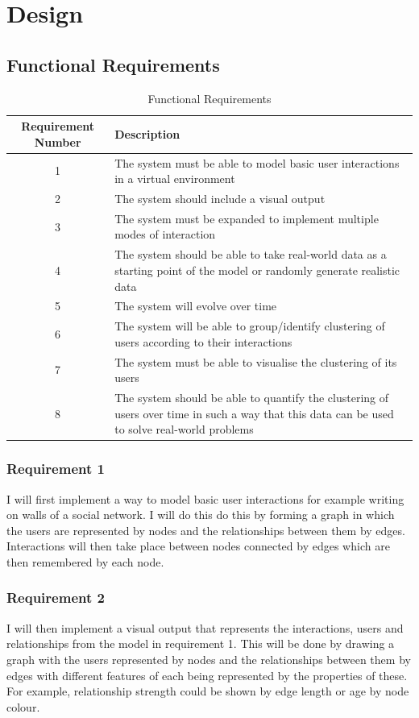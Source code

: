 \documentclass[12pt,a4paper]{article}
\begin{document}
\section{Design}

\subsection{Functional Requirements}

\begin{table}[htb]
\centering
\caption{Functional Requirements}
\vspace*{6pt}
\label{tab:requirements}
\begin{tabular}{c p{11cm}}\hline\hline
Requirement Number & Description \\ \hline
1 & The system must be able to model basic user interactions in a virtual environment \\
2 & The system should include a visual output \\
3 & The system must be expanded to implement multiple modes of interaction\\
4 & The system should be able to take real-world data as a starting point of the model or randomly generate realistic data\\
5 & The system will evolve over time\\
6 & The system will be able to group/identify clustering of users according to their interactions\\
7 & The system must be able to visualise the clustering of its users \\
8 & The system should be able to quantify the clustering of users over time in such a way that this data can be used to solve real-world problems
\end{tabular}
\end{table}

\subsubsection{Requirement 1}
I will first implement a way to model basic user interactions for example writing on walls of a social network. I will do this do this by forming a graph in which the users are represented by nodes and the relationships between them by edges. Interactions will then take place between nodes connected by edges which are then remembered by each node.

\subsubsection{Requirement 2}
I will then implement a visual output that represents the interactions, users and relationships from the model in requirement 1. This will be done by drawing a graph with the users represented by nodes and the relationships between them by edges with different features of each being represented by the properties of these. For example, relationship strength could be shown by edge length or age by node colour.
\end{document}
